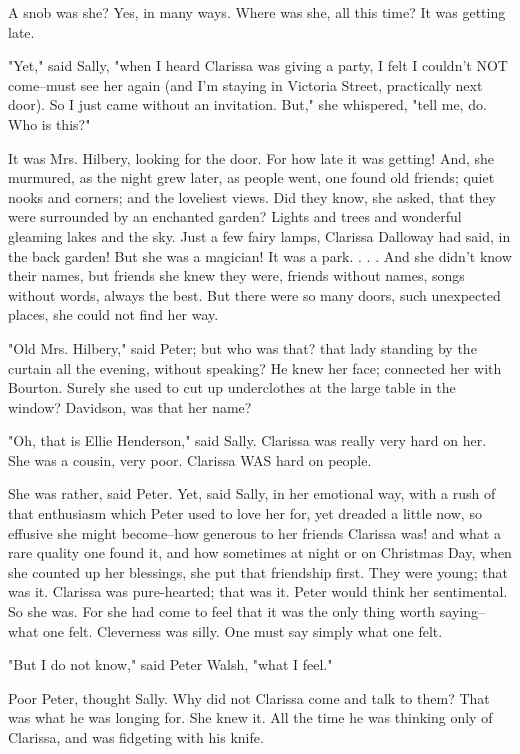 \documentclass[lang=cn,10pt]{elegantbook}
\begin{document}
A snob was she?  Yes, in many ways.  Where was she, all this time?
It was getting late.

"Yet," said Sally, "when I heard Clarissa was giving a party, I
felt I couldn't NOT come--must see her again (and I'm staying in
Victoria Street, practically next door).  So I just came without an
invitation.  But," she whispered, "tell me, do.  Who is this?"

It was Mrs. Hilbery, looking for the door.  For how late it was
getting!  And, she murmured, as the night grew later, as people
went, one found old friends; quiet nooks and corners; and the
loveliest views.  Did they know, she asked, that they were
surrounded by an enchanted garden?  Lights and trees and wonderful
gleaming lakes and the sky.  Just a few fairy lamps, Clarissa
Dalloway had said, in the back garden!  But she was a magician!  It
was a park. . . .  And she didn't know their names, but friends she
knew they were, friends without names, songs without words, always
the best.  But there were so many doors, such unexpected places,
she could not find her way.

"Old Mrs. Hilbery," said Peter; but who was that? that lady
standing by the curtain all the evening, without speaking?  He knew
her face; connected her with Bourton.  Surely she used to cut up
underclothes at the large table in the window?  Davidson, was that
her name?

"Oh, that is Ellie Henderson," said Sally.  Clarissa was really
very hard on her.  She was a cousin, very poor.  Clarissa WAS hard
on people.

She was rather, said Peter.  Yet, said Sally, in her emotional way,
with a rush of that enthusiasm which Peter used to love her for,
yet dreaded a little now, so effusive she might become--how
generous to her friends Clarissa was! and what a rare quality one
found it, and how sometimes at night or on Christmas Day, when she
counted up her blessings, she put that friendship first.  They were
young; that was it.  Clarissa was pure-hearted; that was it.  Peter
would think her sentimental.  So she was.  For she had come to feel
that it was the only thing worth saying--what one felt.  Cleverness
was silly.  One must say simply what one felt.

"But I do not know," said Peter Walsh, "what I feel."

Poor Peter, thought Sally.  Why did not Clarissa come and talk to
them?  That was what he was longing for.  She knew it.  All the
time he was thinking only of Clarissa, and was fidgeting with his
knife.
\end{document}
